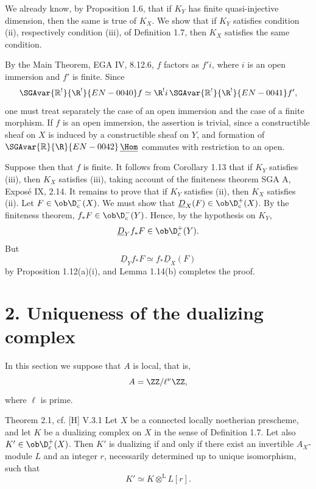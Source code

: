 \begin{prooftext}
We already know, by Proposition 1.6, that if $K_Y$ has finite quasi-injective dimension, then the same is true of $K_X$. We show that if $K_Y$ satisfies condition (ii), respectively condition (iii), of Definition 1.7, then $K_X$ satisfies the same condition.

By the Main Theorem, EGA IV, 8.12.6, $f$ factors as $f'i$, where $i$ is an open immersion and $f'$ is finite. Since
\[
   \SGAvar{\mathbb{R}^!}{\R^!}{EN-0040}f\simeq\R^!i\,\SGAvar{\mathbb{R}^!}{\R^!}{EN-0041}f',
\]
one must treat separately the case of an open immersion and the case of a finite morphism. If $f$ is an open immersion, the assertion is trivial, since a constructible sheaf on $X$ is induced by a constructible sheaf on $Y$, and formation of $\SGAvar{\mathbb{R}}{\R}{EN-0042}\,\underline{\Hom}$ commutes with restriction to an open.

Suppose then that $f$ is finite. It follows from Corollary 1.13 that if $K_Y$ satisfies (iii), then $K_X$ satisfies (iii), taking account of the finiteness theorem SGA A, Exposé IX, 2.14. It remains to prove that if $K_Y$ satisfies (ii), then $K_X$ satisfies (ii). Let $F\in\ob\D_c^-(X)$. We must show that $\underline D_X(F)\in\ob\D_c^+(X)$. By the finiteness theorem, $f_*F\in\ob\D_c^-(Y)$. Hence, by the hypothesis on $K_Y$,
\[
   \underline D_Y f_*F\in\ob\D_c^+(Y).
\]
But
\[
   \underline D_Y f_*F\simeq f_*\underline D_X(F)
\]
by Proposition 1.12(a)(i), and Lemma 1.14(b) completes the proof. \qedtext
\end{prooftext}



\section*{2. Uniqueness of the dualizing complex}

In this section we suppose that $A$ is local, that is,
\[
   A=\ZZ/\ell^\nu\ZZ,
\]
where $\ell$ is prime.

\begin{statement}{Theorem 2.1, cf. [H] V.3.1}
Let $X$ be a connected locally noetherian prescheme, and let $K$ be a dualizing complex on $X$ in the sense of Definition 1.7. Let also $K'\in\ob\D_c^+(X)$. Then $K'$ is dualizing if and only if there exist an invertible $A_X$-module $L$ and an integer $r$, necessarily determined up to unique isomorphism, such that
\[
   K'\simeq K\otimes^{\mathrm L}L[r].
\]
\end{statement}

